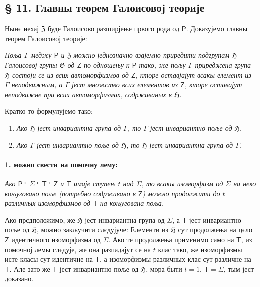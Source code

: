 \documentclass[11pt]{article}
\begin{document}
\subsection*{§ 11. Главны теорем Галоисовој теорије}\label{der-hauptsatz-der-galoisschen-theorie}

Нынє нехај \(\mathfrak Z\) буде Галоисово разширјење првого рода од \(\mathsf P\). Доказујемо главны теорем Галоисовој теорије:

\emph{Поља \(\Gamma\) меджу \(\mathsf P\) и \(\mathfrak Z\) можно једнозначно взајемно приредити подгрупам \(\mathfrak H\) Галоисовој групы \(\mathfrak G\) од \(\mathsf{Z}\) по одношењу к \(\mathsf P\) тако, же пољу \(\Gamma\) приреджена група \(\mathfrak H\) состоји се из всих автоморфизмов од \(\mathsf{Z}\), кторе оставјајут всакы елемент из \(\Gamma\) неподвижным, а \(\Gamma\) јест множство всих елементов из \(\mathsf{Z}\), кторе оставајут неподвижне при всих автоморфизмах, содрживаных в \(\mathfrak H\).}

Кратко то формулујемо тако:

\begin{enumerate}
\item \emph{Ако \(\mathfrak H\) јест инвариантна група од \(\Gamma\), то \(\Gamma\) јест инвариантно поље од \(\mathfrak H\).}
\item \emph{Ако \(\Gamma\) јест инвариантно поље од \(\mathfrak H\), то \(\mathfrak H\) јест инвариантна група од \(\Gamma\).}
\end{enumerate}

\paragraph{1. можно свести на помочну лему:}\label{laesst-sich-zurueckfuehren-auf-den-hilfssatz}

\emph{Ако \(\mathsf P \subseteqq \Sigma \subseteqq \mathsf T \subseteqq \mathsf Z\) и \(\mathsf T\) имаје ступењ \(t\) над \(\Sigma\), то всакы изоморфизм од \(\Sigma\) на неко коњуговано поље (потрєбно содрживано в \(\mathsf Z\)) можно продолжити до \(t\) различных изоморфизмов од \(\mathsf T\) на коњугована поља.}

Ако прєдположимо, же \(\mathfrak H\) јест инвариантна група од \(\Sigma\), а \(\mathsf T\) јест инвариантно поље од \(\mathfrak H\), можно закључити слєдујуче: Елементи из \(\mathfrak H\) сут продолжења на цєло \(\mathsf Z\) идентичного изоморфизма од \(\Sigma\). Ако те продолжења примєнимо само на \(\mathsf T\), из помочној лемы слєдује, же она разпадајут се на \(t\) клас тако, же изоморфизмы исте класы сут идентичне на \(\mathsf T\), а изоморфизмы различных клас сут различне на \(\mathsf T\). Але зато же \(\mathsf T\) јест инвариантно поље од \(\mathfrak H\), мора быти \(t=1\), \(\mathsf T=\Sigma\), тым јест доказано.
\end{document}

